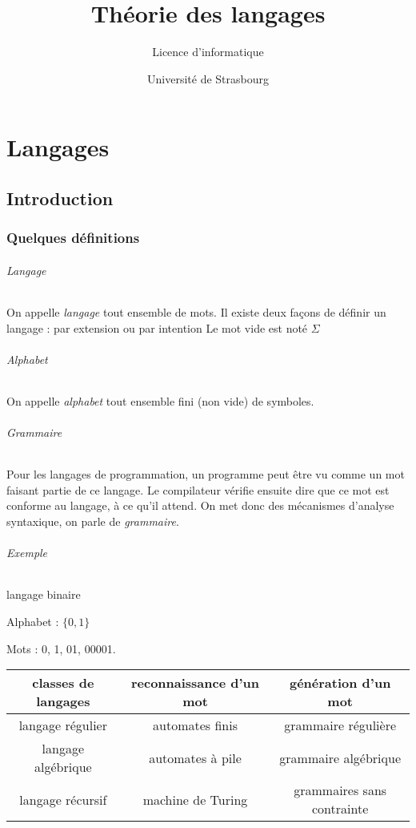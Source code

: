 \documentclass[12pt, a4paper]{report}
\title{Théorie des langages}
\author{Licence d'informatique}
\date{Université de Strasbourg}
\begin{document}
\maketitle

\part{Langages}

\chapter{Introduction}

\section*{Quelques définitions}

\paragraph{Langage} On appelle \textit{langage} tout ensemble de mots.
Il existe deux façons de définir un langage : par extension ou par intention Le mot vide est noté $\Sigma$

\paragraph{Alphabet} On appelle \textit{alphabet} tout ensemble fini (non vide)
de symboles.


\paragraph{Grammaire} 

Pour les langages de programmation, un programme peut être vu comme un
mot faisant partie de ce langage. Le compilateur vérifie ensuite dire
que ce mot est conforme au langage, à ce qu’il attend. On met donc des
mécanismes d’analyse syntaxique, on parle de \textit{grammaire}.


\paragraph{Exemple} langage binaire

Alphabet : $\{0, 1\}$

Mots : 0, 1, 01, 00001.


\begin{center}
\begin{tabular}{|c|c|c|}
\hline
classes de langages & reconnaissance d'un mot & génération d'un mot \\
\hline
\hline
langage régulier  & automates finis & grammaire régulière \\ \hline
langage algébrique & automates à pile & grammaire algébrique \\ \hline
langage récursif & machine de Turing & grammaires sans contrainte \\
\hline
\end{tabular}
\end{center}
\end{document}
